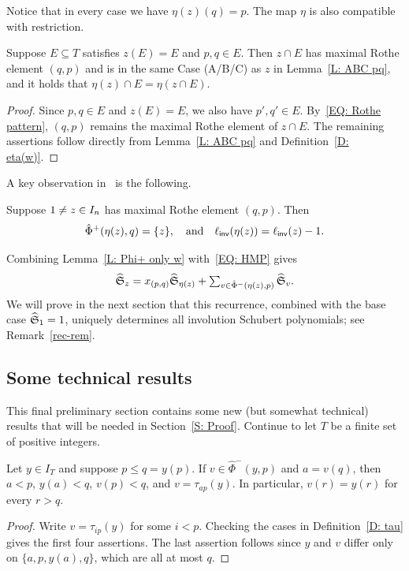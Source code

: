 \documentclass[10pt]{article}
\begin{document}
Notice that in every case we have $\eta(z)(q)=p$.
The map $\eta$ is also compatible with restriction.

\begin{lemma}
\label{L: transition and pattern}
Suppose $E\subseteq T$ satisfies $z(E)=E$
and $p,q\in E$.
Then $z\cap E$ has maximal Rothe element $(q,p)$ and 
is in the same Case (A/B/C) as $z$ in 
Lemma~\ref{L: ABC pq}, 
and it holds that
$\eta(z)\cap E=\eta(z\cap E)$.
\end{lemma}

\begin{proof}
Since $p,q\in E$ and $z(E)=E$,
we also have $p',q'\in E$.
By~\eqref{EQ: Rothe pattern},
$(q,p)$ remains the maximal Rothe element of $z\cap E$.
The remaining assertions follow directly from
Lemma~\ref{L: ABC pq} 
 and Definition~\ref{D: eta(w)}.
\end{proof}


A key observation in~\cite{HMPstanley}
is the following.
\begin{lemma}
\label{L: Phi+ only w}
Suppose $1\neq z\in I_n$ has maximal Rothe element $(q,p)$.
Then 
\[\hat\Phi^{+}(\eta(z),q)=\{z\},
\quad\text{and}\quad \ell_{\mathsf{inv}}(\eta(z))
=\ell_{\mathsf{inv}}(z)-1.\]
\end{lemma}

Combining Lemma~\ref{L: Phi+ only w}
with~\eqref{EQ: HMP} gives
\begin{equation}
\label{EQ: iS Tran}
\textstyle
\widehat{\mathfrak S}_z
=
x_{(p,q)}\widehat{\mathfrak S}_{\eta(z)}
+
\sum_{v\in\hat\Phi^{-}(\eta(z),p)}
\widehat{\mathfrak S}_v.
\end{equation}
We will prove in the next section that this recurrence, combined with the base case $\widehat{\mathfrak S}_1=1$, 
uniquely determines all involution Schubert polynomials; see Remark~\ref{rec-rem}.

\subsection{Some technical results}

This final preliminary section contains some new (but somewhat technical) results that will be needed in Section~\ref{S: Proof}.
Continue to let $T$ be a finite set of positive integers.






\begin{lemma}
\label{L: negative transition at qp}
Let $y\in I_T$ and suppose $p\leq q=y(p)$.
If $v\in\hat\Phi^{-}(y,p)$ and $a=v(q)$, then
$a<p$, $y(a)<q$, $v(p)<q$, and $v=\tau_{ap}(y)$.
In particular, $v(r)=y(r)$ for every $r>q$.
\end{lemma}
\begin{proof}
Write $v=\tau_{ip}(y)$ for some $i<p$.
Checking the cases in Definition~\ref{D: tau} gives the first four assertions.
The last assertion follows since
 $y$ and $v$ differ only on
$\{a,p,y(a),q\}$, which are all 
at most $q$.
\end{proof}
\end{document}
